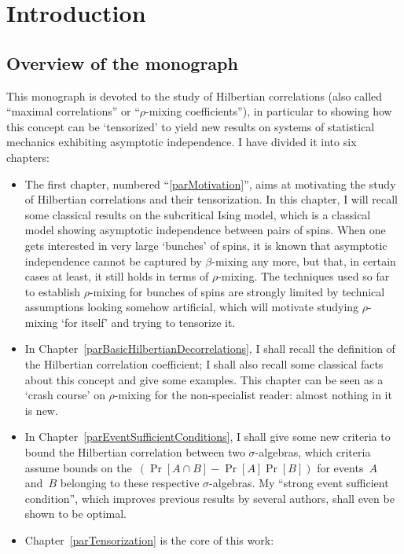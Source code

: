 \chapter*{Introduction}%

\section*{Overview of the monograph}

This monograph is devoted to the study
of Hilbertian correlations (also called ``maximal correlations'' or ``$\rho$-mixing coefficients''),
in particular to showing how this concept can be `tensorized'
to yield new results on systems of statistical mechanics exhibiting asymptotic independence.
I have divided it into six chapters:
%
\begin{itemize}
\item The first chapter, numbered ``\ref{parMotivation}'',
aims at motivating the study of Hilbertian correlations and their tensorization.
In this chapter, I will recall some classical results on the subcritical Ising model,
which is a classical model showing asymptotic independence between pairs of spins.
When one gets interested in very large `bunches' of spins,
it is known that asymptotic independence cannot be captured by $\beta$-mixing any more,
but that, in certain cases at least, it still holds in terms of $\rho$-mixing.
The techniques used so far to establish $\rho$-mixing for bunches of spins
are strongly limited by technical assumptions looking somehow artificial,
which will motivate studying $\rho$-mixing `for itself' and trying to tensorize it.
%
\item In Chapter~\ref{parBasicHilbertianDecorrelations},
I shall recall the definition of the Hilbertian correlation coefficient;
I shall also recall some classical facts about this concept and give some examples.
This chapter can be seen as a `crash course' on $\rho$-mixing for the non-specialist reader:
almost nothing in it is new.
%
\item In Chapter~\ref{parEventSufficientConditions}, I shall give some new criteria
to bound the Hilbertian correlation between two $\sigma$-algebras,
which criteria assume bounds on the~$(\Pr[A\cap B] - \Pr[A]\Pr[B])$
for events~$A$ and~$B$ belonging to these respective $\sigma$-algebras.
My ``strong event sufficient condition'', which improves previous results by several authors,
shall even be shown to be optimal.
\item Chapter~\ref{parTensorization} is the core of this work:

\end{itemize}
